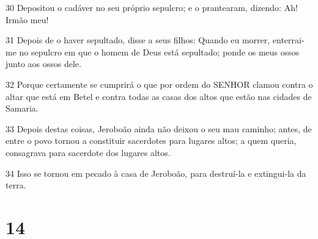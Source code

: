 \par 30 Depositou o cadáver no seu próprio sepulcro; e o prantearam, dizendo: Ah! Irmão meu!
\par 31 Depois de o haver sepultado, disse a seus filhos: Quando eu morrer, enterrai-me no sepulcro em que o homem de Deus está sepultado; ponde os meus ossos junto aos ossos dele.
\par 32 Porque certamente se cumprirá o que por ordem do SENHOR clamou contra o altar que está em Betel e contra todas as casas dos altos que estão nas cidades de Samaria.
\par 33 Depois destas coisas, Jeroboão ainda não deixou o seu mau caminho; antes, de entre o povo tornou a constituir sacerdotes para lugares altos; a quem queria, consagrava para sacerdote dos lugares altos.
\par 34 Isso se tornou em pecado à casa de Jeroboão, para destruí-la e extingui-la da terra.

\chapter{14}

